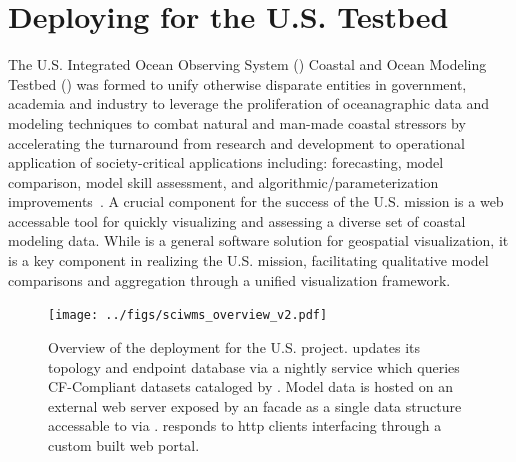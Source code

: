 \section{Deploying \sciwms{} for the U.S. \ioos{} \comt{} Testbed}

The U.S. Integrated Ocean Observing System (\ioos{}) Coastal and Ocean
Modeling Testbed (\comt{}) was formed to unify otherwise disparate
entities in government, academia and industry to leverage the
proliferation of oceanagraphic data and modeling techniques to combat
natural and man-made coastal stressors by accelerating the turnaround
from research and development to operational application of
society-critical applications including: forecasting, model
comparison, model skill assessment, and algorithmic/parameterization
improvements~\cite{luettich13}. A crucial component for the success of
the U.S. \ioos{} \comt{} mission is a web accessable tool for quickly
visualizing and assessing a diverse set of coastal modeling
data. While \sciwms{} is a general software solution for geospatial
visualization, it is a key component in realizing the U.S. \ioos{}
\comt{} mission, facilitating qualitative model comparisons and
aggregation through a unified visualization framework.
\begin{figure}[ht!]
  \centering
  \texttt{[image: ../figs/sciwms\_overview\_v2.pdf]}
  \caption{Overview of the \sciwms{} deployment for the U.S. \ioos{}
    \comt{} project. \Sciwms{} updates its topology and endpoint
    database via a nightly service which queries CF-Compliant datasets
    cataloged by \ngdc{}. Model data is hosted on an external web server
    exposed by an \ncml{} facade as a single \netcdf{} data structure
    accessable to \sciwms{} via \opendap{}. \Sciwms{} responds to http
    clients interfacing through a custom built web portal.}
  \label{fig:overview1}
\end{figure}
